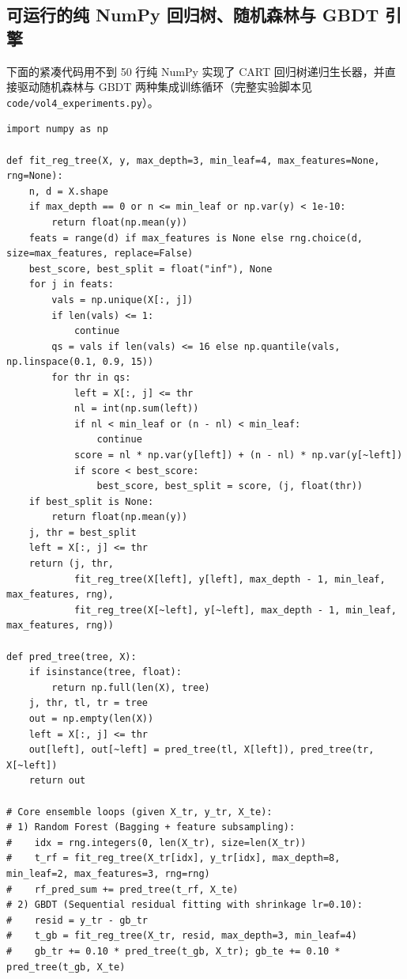 \subsection{可运行的纯 NumPy 回归树、随机森林与 GBDT 引擎}

下面的紧凑代码用不到 50 行纯 NumPy 实现了 CART 回归树递归生长器，并直接驱动随机森林与 GBDT 两种集成训练循环（完整实验脚本见 \texttt{code/\allowbreak vol4\_experiments.py}）。

\begin{lstlisting}[caption={纯 NumPy 实现 CART 回归树、随机森林与 GBDT 核心循环},label={lst:trees-ensemble}]
import numpy as np

def fit_reg_tree(X, y, max_depth=3, min_leaf=4, max_features=None, rng=None):
    n, d = X.shape
    if max_depth == 0 or n <= min_leaf or np.var(y) < 1e-10:
        return float(np.mean(y))
    feats = range(d) if max_features is None else rng.choice(d, size=max_features, replace=False)
    best_score, best_split = float("inf"), None
    for j in feats:
        vals = np.unique(X[:, j])
        if len(vals) <= 1:
            continue
        qs = vals if len(vals) <= 16 else np.quantile(vals, np.linspace(0.1, 0.9, 15))
        for thr in qs:
            left = X[:, j] <= thr
            nl = int(np.sum(left))
            if nl < min_leaf or (n - nl) < min_leaf:
                continue
            score = nl * np.var(y[left]) + (n - nl) * np.var(y[~left])
            if score < best_score:
                best_score, best_split = score, (j, float(thr))
    if best_split is None:
        return float(np.mean(y))
    j, thr = best_split
    left = X[:, j] <= thr
    return (j, thr,
            fit_reg_tree(X[left], y[left], max_depth - 1, min_leaf, max_features, rng),
            fit_reg_tree(X[~left], y[~left], max_depth - 1, min_leaf, max_features, rng))

def pred_tree(tree, X):
    if isinstance(tree, float):
        return np.full(len(X), tree)
    j, thr, tl, tr = tree
    out = np.empty(len(X))
    left = X[:, j] <= thr
    out[left], out[~left] = pred_tree(tl, X[left]), pred_tree(tr, X[~left])
    return out

# Core ensemble loops (given X_tr, y_tr, X_te):
# 1) Random Forest (Bagging + feature subsampling):
#    idx = rng.integers(0, len(X_tr), size=len(X_tr))
#    t_rf = fit_reg_tree(X_tr[idx], y_tr[idx], max_depth=8, min_leaf=2, max_features=3, rng=rng)
#    rf_pred_sum += pred_tree(t_rf, X_te)
# 2) GBDT (Sequential residual fitting with shrinkage lr=0.10):
#    resid = y_tr - gb_tr
#    t_gb = fit_reg_tree(X_tr, resid, max_depth=3, min_leaf=4)
#    gb_tr += 0.10 * pred_tree(t_gb, X_tr); gb_te += 0.10 * pred_tree(t_gb, X_te)
\end{lstlisting}

